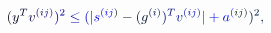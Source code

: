 \documentclass[12pt]{article}
\begin{document}
\makeatletter
\renewcommand*{\@textcolor}[3]{%
  \protect\leavevmode
  \begingroup
    \color#1{#2}#3%
  \endgroup
}
\makeatother
\begin{displaymath}
\mathcolor[RGB]{0,0,15}{(} \mathcolor[RGB]{0,0,30}{y} ^ { \mathcolor[RGB]{0,0,45}{T} } \mathcolor[RGB]{0,0,60}{v} ^ { \mathcolor[RGB]{0,0,75}{(} \mathcolor[RGB]{0,0,90}{i} \mathcolor[RGB]{0,0,105}{j} \mathcolor[RGB]{0,0,120}{)} } \mathcolor[RGB]{0,0,135}{)} ^ { \mathcolor[RGB]{0,0,150}{2} } \mathcolor[RGB]{0,0,165}{\leq} \mathcolor[RGB]{0,0,180}{(} \mathcolor[RGB]{0,0,195}{|} \mathcolor[RGB]{0,0,210}{s} ^ { \mathcolor[RGB]{0,0,225}{(} \mathcolor[RGB]{0,0,240}{i} \mathcolor[RGB]{0,0,255}{j} \mathcolor[RGB]{0,15,0}{)} } \mathcolor[RGB]{0,15,15}{-} \mathcolor[RGB]{0,15,30}{(} \mathcolor[RGB]{0,15,45}{g} ^ { \mathcolor[RGB]{0,15,60}{(} \mathcolor[RGB]{0,15,75}{i} \mathcolor[RGB]{0,15,90}{)} } \mathcolor[RGB]{0,15,105}{)} ^ { \mathcolor[RGB]{0,15,120}{T} } \mathcolor[RGB]{0,15,135}{v} ^ { \mathcolor[RGB]{0,15,150}{(} \mathcolor[RGB]{0,15,165}{i} \mathcolor[RGB]{0,15,180}{j} \mathcolor[RGB]{0,15,195}{)} } \mathcolor[RGB]{0,15,210}{|} \mathcolor[RGB]{0,15,225}{+} \mathcolor[RGB]{0,15,240}{a} ^ { \mathcolor[RGB]{0,15,255}{(} \mathcolor[RGB]{0,30,0}{i} \mathcolor[RGB]{0,30,15}{j} \mathcolor[RGB]{0,30,30}{)} } \mathcolor[RGB]{0,30,45}{)} ^ { \mathcolor[RGB]{0,30,60}{2} } \mathcolor[RGB]{0,30,75}{,}
\end{displaymath}
\end{document}
